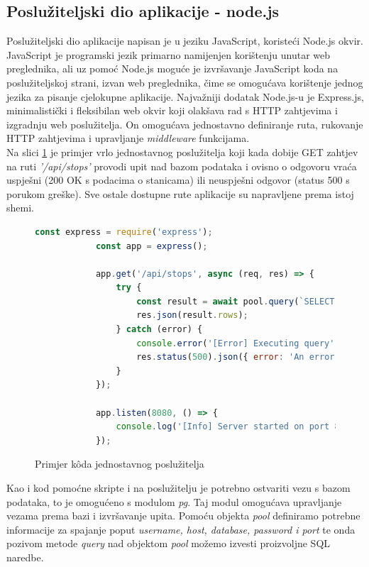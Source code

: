 \documentclass[zavrsnirad]{fer}
\begin{document}
\subsection{Poslužiteljski dio aplikacije - node.js}
Poslužiteljski dio aplikacije napisan je u jeziku JavaScript, koristeći Node.js okvir. JavaScript je programski jezik primarno namijenjen korištenju unutar web preglednika, ali uz pomoć Node.js moguće je izvršavanje JavaScript koda na poslužiteljskoj strani, izvan web preglednika, čime se omogućava korištenje jednog jezika za pisanje cjelokupne aplikacije. Najvažniji dodatak Node.js-u je Express.js, minimalistički i fleksibilan web okvir koji olakšava rad s HTTP zahtjevima i izgradnju web poslužitelja. On omogućava jednostavno definiranje ruta, rukovanje HTTP zahtjevima i upravljanje \textit{middleware} funkcijama.\\
Na slici \ref{slk:express} je primjer vrlo jednostavnog poslužitelja koji kada dobije GET zahtjev na ruti \textit{'/api/stops'} provodi upit nad bazom podataka i ovisno o odgovoru vraća uspješni (200 OK s podacima o stanicama) ili neuspješni odgovor (status 500 s porukom greške). Sve ostale dostupne rute aplikacije su napravljene prema istoj shemi.

\begin{figure}[H]
	\centering
	\begin{minipage}{0.9\linewidth}
		\begin{lstlisting}[language=JavaScript]
			const express = require('express');
			const app = express();
			
			app.get('/api/stops', async (req, res) => {
				try {
					const result = await pool.query(`SELECT DISTINCT stop_name FROM stops`);
					res.json(result.rows);
				} catch (error) {
					console.error('[Error] Executing query', error);
					res.status(500).json({ error: 'An error occurred' });
				}
			});
			
			app.listen(8080, () => {
				console.log('[Info] Server started on port 8080');
			});
		\end{lstlisting}
	\end{minipage}
	\caption{Primjer k\^oda jednostavnog poslužitelja}
	\label{slk:express}
\end{figure}

Kao i kod pomoćne skripte i na poslužitelju je potrebno ostvariti vezu s bazom podataka, to je omogućeno s modulom \textit{pg}. Taj modul omogućava upravljanje vezama prema bazi i izvršavanje upita.
Pomoću objekta \textit{pool} definiramo potrebne informacije za spajanje poput \textit{username, host, database, password i port} te onda pozivom metode \textit{query} nad objektom \textit{pool} možemo izvesti proizvoljne SQL naredbe.
\end{document}
